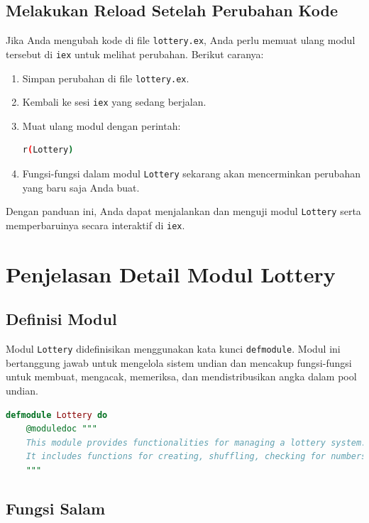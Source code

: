 \subsection{Melakukan Reload Setelah Perubahan Kode}

Jika Anda mengubah kode di file \texttt{lottery.ex}, Anda perlu memuat ulang modul tersebut di \texttt{iex} untuk melihat perubahan. Berikut caranya:

\begin{enumerate}
	\item Simpan perubahan di file \texttt{lottery.ex}.
	\item Kembali ke sesi \texttt{iex} yang sedang berjalan.
	\item Muat ulang modul dengan perintah:
	\begin{lstlisting}[language=bash]
		r(Lottery)
	\end{lstlisting}
	\item Fungsi-fungsi dalam modul \texttt{Lottery} sekarang akan mencerminkan perubahan yang baru saja Anda buat.
\end{enumerate}

Dengan panduan ini, Anda dapat menjalankan dan menguji modul \texttt{Lottery} serta memperbaruinya secara interaktif di \texttt{iex}.


\section{Penjelasan Detail Modul Lottery}

\subsection{Definisi Modul}

Modul \texttt{Lottery} didefinisikan menggunakan kata kunci \texttt{defmodule}. Modul ini bertanggung jawab untuk mengelola sistem undian dan mencakup fungsi-fungsi untuk membuat, mengacak, memeriksa, dan mendistribusikan angka dalam pool undian.

\begin{lstlisting}[language=elixir, caption={Definisi Modul Lottery}]
	defmodule Lottery do
	@moduledoc """
	This module provides functionalities for managing a lottery system.
	It includes functions for creating, shuffling, checking for numbers, and distributing numbers within the lottery pool.
	"""
\end{lstlisting}

\subsection{Fungsi Salam}


